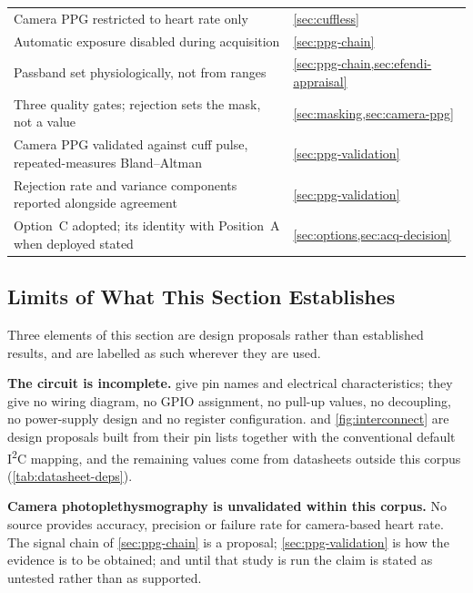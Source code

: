 \documentclass[12pt,a4paper,oneside]{report}
\begin{document}
\begin{table}[htbp]
\begin{tabularx}{\textwidth}{@{}X >{\raggedright\arraybackslash}p{5.0cm}@{}}
Camera PPG restricted to heart rate only & \cref{sec:cuffless} \\
Automatic exposure disabled during acquisition & \cref{sec:ppg-chain} \\
Passband set physiologically, not from \textcite{efendi2025} ranges & \cref{sec:ppg-chain,sec:efendi-appraisal} \\
Three quality gates; rejection sets the mask, not a value & \cref{sec:masking,sec:camera-ppg} \\
Camera PPG validated against cuff pulse, repeated-measures Bland--Altman & \cref{sec:ppg-validation} \\
Rejection rate and variance components reported alongside agreement & \cref{sec:ppg-validation} \\
Option~C adopted; its identity with Position~A when deployed stated & \cref{sec:options,sec:acq-decision} \\
\bottomrule
\end{tabularx}
\end{table}

\subsection{Limits of What This Section Establishes}\label{sec:iot-limits}

Three elements of this section are design proposals rather than established results, and are labelled as such wherever they are used.

\textbf{The circuit is incomplete.} \Textcite{efendi2025} give pin names and electrical characteristics; they give no wiring diagram, no GPIO assignment, no pull-up values, no decoupling, no power-supply design and no register configuration.  and \cref{fig:interconnect} are design proposals built from their pin lists together with the conventional default I\textsuperscript{2}C mapping, and the remaining values come from datasheets outside this corpus (\cref{tab:datasheet-deps}).

\textbf{Camera photoplethysmography is unvalidated within this corpus.} No source provides accuracy, precision or failure rate for camera-based heart rate. The signal chain of \cref{sec:ppg-chain} is a proposal; \cref{sec:ppg-validation} is how the evidence is to be obtained; and until that study is run the claim is stated as untested rather than as supported.
\end{document}
